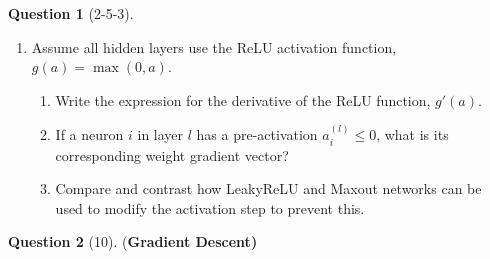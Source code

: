 \documentclass[12pt]{article}
\newif\ifexercise
\newif\ifsolution
\theoremstyle{definition}
\newtheorem{exercise}{Question}%
\newtheorem{answer}{Answer} %
\newcommand{\Exercise}[1]{
\ifexercise#1\fi
}
\newcommand{\Answer}[1]{
\ifsolution\color{answer}\begin{answer}#1\end{answer}\fi
}
\newif\ifexercise
\newif\ifsolution
\begin{document}
\begin{exercise}[2-5-3]
{\begin{enumerate}
    \item Assume all hidden layers use the ReLU activation function, $g(a) = \max(0, a)$.
    \begin{enumerate}
        \item Write the expression for the derivative of the ReLU function, $g'(a)$.
        \item If a neuron $i$ in layer $l$ has a pre-activation $a_i^{(l)} \leq 0$, what is its corresponding weight gradient vector?
        \item Compare and contrast how LeakyReLU and Maxout networks can be used to modify the activation step to prevent this.
    \end{enumerate}
\end{enumerate}

}

\Answer{
}

\end{exercise}

\begin{exercise}[10] (\textbf{Gradient Descent)}
\Exercise{\label{ex:loss-hessian}

Suppose the loss function takes the following form
$$
L=L_0+\frac{1}{2}\left(\mathbf{w}-\mathbf{w}^{\star}\right)^{\mathrm{T}} \mathbf{H}\left(\mathbf{w}-\mathbf{w}^{\star}\right)
$$

where $\mathbf{w}^{\star}$ is the minimum, and the Hessian matrix $\mathbf{H}$ is positive definite and constant. Suppose the initial weight vector $\mathbf{w}^{(0)}$ is chosen to be at the origin and is updated using simple gradient descent. 
$$
\mathbf{w}^{(k)}=\mathbf{w}^{(k-1)}-\rho \nabla L
$$

where $k$ denotes the step number, and $\rho$ is the learning rate (which is assumed to be small). Show using mathematical induction that, after $k$ steps, the components of the weight vector parallel to the eigenvectors of $\mathbf{H}$ can be written as 

$$
w_j^{(k)}=\left\{1-\left(1-\rho \eta_j\right)^k\right\} w_j^{\star}
$$

where $w_j=\mathbf{w}^{\mathrm{T}} \mathbf{u}_j$, and $\mathbf{u}_j$ and $\eta_j$ are the eigenvectors and eigenvalues, respectively, of $\mathbf{H}$ so that

$$
\mathbf{H} \mathbf{u}_j=\eta_j \mathbf{u}_j
$$
 
Show that as $k \rightarrow \infty$, this gives $\mathbf{w}^{(k)} \rightarrow \mathbf{w}^{\star}$ as expected, provided $\left|1-\rho \eta_j\right|<1$.

}

\Answer{
}

\end{exercise}
\end{document}
